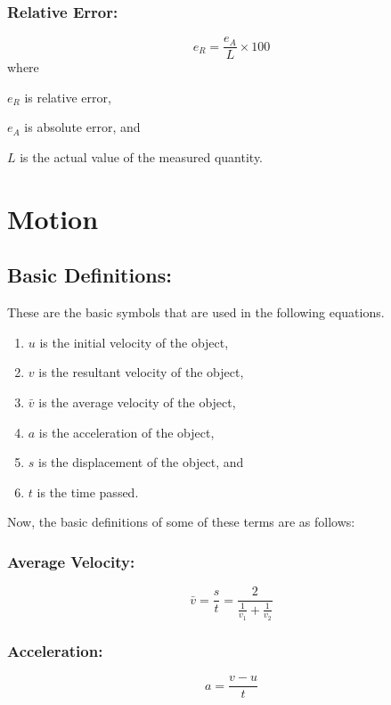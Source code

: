 \documentclass[a4paper]{report}
\begin{document}
        \subsection{Relative Error: }
            \begin{equation}
                e_R = \frac{e_A}{L} \times 100%
            \end{equation}
            where
            \begin{description}
                \item $e_R$ is relative error,
                \item $e_A$ is absolute error, and
                \item $L$ is the actual value of the measured quantity.
            \end{description}


\chapter{Motion}
    \section{Basic Definitions: }
        These are the basic symbols that are used in the following equations.
        \begin{enumerate}
        \item $u$ is the initial velocity of the object,
        \item $v$ is the resultant velocity of the object,
        \item $\bar{v}$ is the average velocity of the object,
        \item $a$ is the acceleration of the object,
        \item $s$ is the displacement of the object, and
        \item $t$ is the time passed.
        \end{enumerate}
        Now, the basic definitions of some of these terms are as follows:
        \subsection{Average Velocity: }
            \begin{equation}
                \bar{v} = \frac{s}{t} = \frac{2}{\frac{1}{v_1} + \frac{1}{v_2}}
            \end{equation}
        \subsection{Acceleration: }
            \begin{equation}
            a = \frac{v - u}{t}
            \end{equation}
\end{document}
